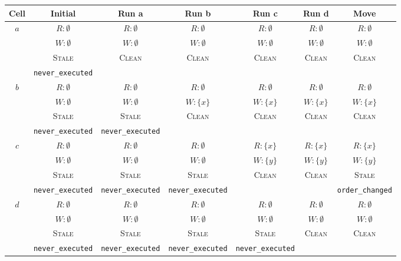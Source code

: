 \documentclass{article}
\begin{document}
\begin{center}
\small
\begin{tabular}{|c|c|c|c|c|c|c|}
\hline
\textbf{Cell} & \textbf{Initial} & \textbf{Run a} & \textbf{Run b} & \textbf{Run c} & \textbf{Run d} & \textbf{Move} \\
\hline
\multirow{4}{*}{$a$}
  & $R: \emptyset$ & $R: \emptyset$ & $R: \emptyset$ & $R: \emptyset$ & $R: \emptyset$ & $R: \emptyset$ \\
  & $W: \emptyset$ & $W: \emptyset$ & $W: \emptyset$ & $W: \emptyset$ & $W: \emptyset$ & $W: \emptyset$ \\
  & \textsc{Stale} & \textsc{Clean} & \textsc{Clean} & \textsc{Clean} & \textsc{Clean} & \textsc{Clean} \\
  & \footnotesize\texttt{never\_executed} &  &  &  &  &  \\
\hline
\multirow{4}{*}{$b$}
  & $R: \emptyset$ & $R: \emptyset$ & $R: \emptyset$ & $R: \emptyset$ & $R: \emptyset$ & $R: \emptyset$ \\
  & $W: \emptyset$ & $W: \emptyset$ & $W: \{x\}$ & $W: \{x\}$ & $W: \{x\}$ & $W: \{x\}$ \\
  & \textsc{Stale} & \textsc{Stale} & \textsc{Clean} & \textsc{Clean} & \textsc{Clean} & \textsc{Clean} \\
  & \footnotesize\texttt{never\_executed} & \footnotesize\texttt{never\_executed} &  &  &  &  \\
\hline
\multirow{4}{*}{$c$}
  & $R: \emptyset$ & $R: \emptyset$ & $R: \emptyset$ & $R: \{x\}$ & $R: \{x\}$ & $R: \{x\}$ \\
  & $W: \emptyset$ & $W: \emptyset$ & $W: \emptyset$ & $W: \{y\}$ & $W: \{y\}$ & $W: \{y\}$ \\
  & \textsc{Stale} & \textsc{Stale} & \textsc{Stale} & \textsc{Clean} & \textsc{Clean} & \textsc{Stale} \\
  & \footnotesize\texttt{never\_executed} & \footnotesize\texttt{never\_executed} & \footnotesize\texttt{never\_executed} &  &  & \footnotesize\texttt{order\_changed} \\
\hline
\multirow{4}{*}{$d$}
  & $R: \emptyset$ & $R: \emptyset$ & $R: \emptyset$ & $R: \emptyset$ & $R: \emptyset$ & $R: \emptyset$ \\
  & $W: \emptyset$ & $W: \emptyset$ & $W: \emptyset$ & $W: \emptyset$ & $W: \emptyset$ & $W: \emptyset$ \\
  & \textsc{Stale} & \textsc{Stale} & \textsc{Stale} & \textsc{Stale} & \textsc{Clean} & \textsc{Clean} \\
  & \footnotesize\texttt{never\_executed} & \footnotesize\texttt{never\_executed} & \footnotesize\texttt{never\_executed} & \footnotesize\texttt{never\_executed} &  &  \\
\hline
\end{tabular}
\end{center}
\end{document}
